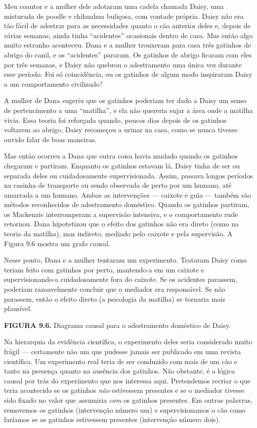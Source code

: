 \documentclass[11pt,a5paper,twoside]{book}
\begin{document}
Meu coautor e a mulher dele adotaram uma cadela chamada Daisy, uma misturada de poodle e chihuahua buliçosa, com vontade própria. Daisy não era tão fácil de adestrar para as necessidades quanto o cão anterior deles e, depois de várias semanas, ainda tinha “acidentes” ocasionais dentro de casa. Mas então algo muito estranho aconteceu. Dana e a mulher trouxeram para casa três gatinhos de abrigo do canil, e os “acidentes” pararam. Os gatinhos de abrigo ficaram com eles por três semanas, e Daisy não quebrou o adestramento uma única vez durante esse período. Foi só coincidência, ou os gatinhos de algum modo inspiraram Daisy a um comportamento civilizado?

A mulher de Dana sugeriu que os gatinhos poderiam ter dado a Daisy um senso de pertencimento a uma “matilha”, e ela não quereria sujar a área onde a matilha vivia. Essa teoria foi reforçada quando, poucos dias depois de os gatinhos voltarem ao abrigo, Daisy recomeçou a urinar na casa, como se nunca tivesse ouvido falar de boas maneiras.

Mas então ocorreu a Dana que outra coisa havia mudado quando os gatinhos chegaram e partiram. Enquanto os gatinhos estavam lá, Daisy tinha de ser ou separada deles ou cuidadosamente supervisionada. Assim, passava longos períodos na casinha de transporte ou sendo observada de perto por um humano, até amarrada a um humano. Ambas as intervenções — caixote e guia — também são métodos reconhecidos de adestramento doméstico. Quando os gatinhos partiram, os Mackenzie interromperam a supervisão intensiva, e o comportamento rude retornou. Dana hipotetizou que o efeito dos gatinhos não era direto (como na teoria da matilha), mas indireto, mediado pelo caixote e pela supervisão. A Figura 9.6 mostra um grafo causal.

Nesse ponto, Dana e a mulher tentaram um experimento. Trataram Daisy como teriam feito com gatinhos por perto, mantendo-a em um caixote e supervisionando-a cuidadosamente fora do caixote. Se os acidentes parassem, poderiam razoavelmente concluir que o mediador era responsável. Se não parassem, então o efeito direto (a psicologia da matilha) se tornaria mais plausível.

\textbf{FIGURA 9.6.} Diagrama causal para o adestramento doméstico de Daisy.

Na hierarquia da evidência científica, o experimento deles seria considerado muito frágil — certamente não um que pudesse jamais ser publicado em uma revista científica. Um experimento real teria de ser conduzido com mais de um cão e tanto na presença quanto na ausência dos gatinhos. Não obstante, é a lógica causal por trás do experimento que nos interessa aqui. Pretendemos recriar o que teria acontecido se os gatinhos \textit{não} estivessem presentes e se o mediador tivesse sido fixado no valor que assumiria \textit{com} os gatinhos presentes. Em outras palavras, removemos os gatinhos (intervenção número um) e supervisionamos o cão como faríamos se os gatinhos estivessem presentes (intervenção número dois).
\end{document}
